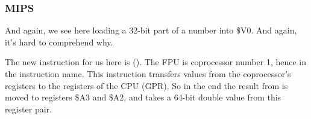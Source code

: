 \subsubsection{MIPS}



And again, we see here  loading a 32-bit part of a \Tdouble number into \$V0.
And again, it's hard to comprehend why.


The new instruction for us here is  ().
The FPU is coprocessor number 1, hence  in the instruction name.
This instruction transfers values from the coprocessor's registers to the registers of the CPU (\ac{GPR}).
So in the end the result from  is moved to registers \$A3 and \$A2, 
and \printf takes a 64-bit double value from this register pair.


